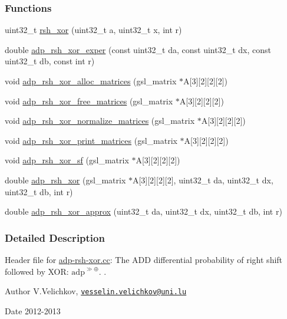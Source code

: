\subsubsection*{\-Functions}
\begin{DoxyCompactItemize}
\item 
uint32\-\_\-t \hyperlink{adp-rsh-xor_8hh_ac0367fa7d61faaf3b1b661de03ff932f}{rsh\-\_\-xor} (uint32\-\_\-t a, uint32\-\_\-t x, int r)
\item 
double \hyperlink{adp-rsh-xor_8hh_a2b0e5e4fad623f4e3246a25b897aa984}{adp\-\_\-rsh\-\_\-xor\-\_\-exper} (const uint32\-\_\-t da, const uint32\-\_\-t dx, const uint32\-\_\-t db, const int r)
\item 
void \hyperlink{adp-rsh-xor_8hh_a75f7c2477e1ccb1ea0d903024fe26a4e}{adp\-\_\-rsh\-\_\-xor\-\_\-alloc\-\_\-matrices} (gsl\-\_\-matrix $\ast$\-A\mbox{[}3\mbox{]}\mbox{[}2\mbox{]}\mbox{[}2\mbox{]}\mbox{[}2\mbox{]})
\item 
void \hyperlink{adp-rsh-xor_8hh_ae9cae9f38ce4ca450faa24c5dc4def67}{adp\-\_\-rsh\-\_\-xor\-\_\-free\-\_\-matrices} (gsl\-\_\-matrix $\ast$\-A\mbox{[}3\mbox{]}\mbox{[}2\mbox{]}\mbox{[}2\mbox{]}\mbox{[}2\mbox{]})
\item 
void \hyperlink{adp-rsh-xor_8hh_a0a7be269d6973d2d8b14d3425aa7d7c1}{adp\-\_\-rsh\-\_\-xor\-\_\-normalize\-\_\-matrices} (gsl\-\_\-matrix $\ast$\-A\mbox{[}3\mbox{]}\mbox{[}2\mbox{]}\mbox{[}2\mbox{]}\mbox{[}2\mbox{]})
\item 
void \hyperlink{adp-rsh-xor_8hh_afaee6cf06ffdf316c8c2f62d6fe4c0c3}{adp\-\_\-rsh\-\_\-xor\-\_\-print\-\_\-matrices} (gsl\-\_\-matrix $\ast$\-A\mbox{[}3\mbox{]}\mbox{[}2\mbox{]}\mbox{[}2\mbox{]}\mbox{[}2\mbox{]})
\item 
void \hyperlink{adp-rsh-xor_8hh_a0084433781fe544264dfa08494b4d347}{adp\-\_\-rsh\-\_\-xor\-\_\-sf} (gsl\-\_\-matrix $\ast$\-A\mbox{[}3\mbox{]}\mbox{[}2\mbox{]}\mbox{[}2\mbox{]}\mbox{[}2\mbox{]})
\item 
double \hyperlink{adp-rsh-xor_8hh_ab5601221902574eabd3ae7bc6c1dc470}{adp\-\_\-rsh\-\_\-xor} (gsl\-\_\-matrix $\ast$\-A\mbox{[}3\mbox{]}\mbox{[}2\mbox{]}\mbox{[}2\mbox{]}\mbox{[}2\mbox{]}, uint32\-\_\-t da, uint32\-\_\-t dx, uint32\-\_\-t db, int r)
\item 
double \hyperlink{adp-rsh-xor_8hh_ad1cca89daeb0fbc44dbef81d81e083f1}{adp\-\_\-rsh\-\_\-xor\-\_\-approx} (uint32\-\_\-t da, uint32\-\_\-t dx, uint32\-\_\-t db, int r)
\end{DoxyCompactItemize}


\subsubsection{\-Detailed \-Description}
\-Header file for \hyperlink{adp-rsh-xor_8cc}{adp-\/rsh-\/xor.\-cc}\-: \-The \-A\-D\-D differential probability of right shift followed by \-X\-O\-R\-: $\mathrm{adp}^{\gg\oplus}$. . \begin{DoxyAuthor}{\-Author}
\-V.\-Velichkov, \href{mailto:vesselin.velichkov@uni.lu}{\tt vesselin.\-velichkov@uni.\-lu} 
\end{DoxyAuthor}
\begin{DoxyDate}{\-Date}
2012-\/2013 
\end{DoxyDate}



